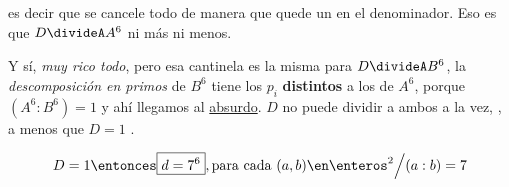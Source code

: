 es decir que se cancele todo de manera que quede un  en el denominador.
Eso es que $D \divideA A^6$ ni más ni menos.\par

Y sí, \textit{muy rico todo}, pero esa cantinela es la misma para $D \divideA B^6$,  la
\textit{descomposición en primos} de $B^6$ tiene los $p_i$ \textbf{distintos} a los de $A^6$, porque
$(A^6:B^6) = 1$\red{!} y ahí llegamos al \underline{absurdo}. $D$ no puede dividir a ambos
a la vez, , a menos que $D = 1$ \Tilde.

$$
  D = 1 \entonces \boxed{d = 7^6}, \text{para cada } (a,b) \en \enteros^2 \Big / (a:b) = 7
$$
